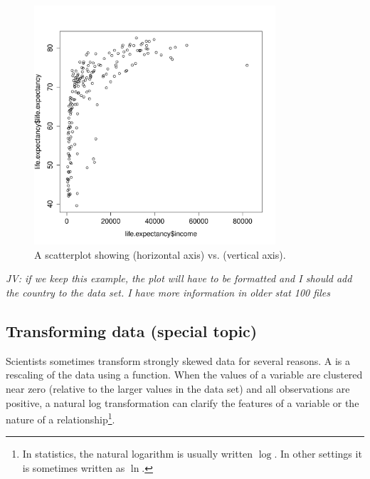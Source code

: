 \begin{doublespace}
\begin{figure}
\centering
\includegraphics[width=0.8\textwidth]
{ch_intro_to_data_oi_biostat/figures/incomeLifeExpectancy/incomeLifeExpectancy.pdf}
\caption{A scatterplot showing  (horizontal axis) vs.   (vertical axis).} 
\label{incomeLifeExpectancy}
\end{figure}

\textit{JV: if we keep this example, the plot will have to be formatted and I should add the country to the data set.  I have more information in older stat 100 files}


\subsection{Transforming data (special topic)}
\label{transformingDataSubsection}



Scientists sometimes transform strongly skewed data for several reasons. A  is a rescaling of the data using a function.  When the values of a variable are clustered near zero (relative to the larger values in the data set) and all observations are positive, a natural log transformation can clarify the features of a variable or the nature of a relationship\footnote{In statistics, the natural logarithm is usually written $\log$. In other settings it is sometimes written as  $\ln$.}. 


\end{doublespace}
